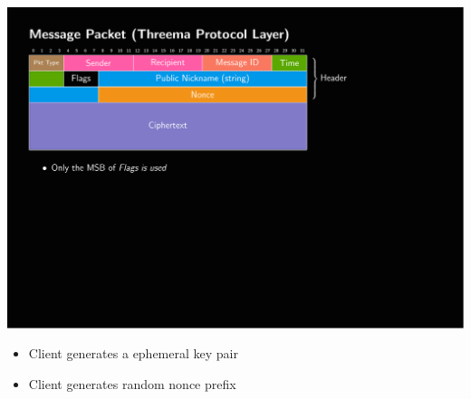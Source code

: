 \documentclass[
	aspectratio=169,
	xetex,
]{beamer}
\begin{document}
\begin{frame}[t]
\begin{overlayarea}{\textwidth}{\textheight}
\begin{columns}
\begin{column}[t]{.69\textwidth}
\begin{overlayarea}{\textwidth}{\textheight}
{						\includegraphics[page=11,clip,trim={.99cm 9cm 3.2cm 2.55cm},width=\textwidth]{out/messages.pdf}
						\begin{itemize}
							\item Client generates a \alert{ephemeral key} pair
							\item Client generates random nonce prefix
						\end{itemize}
					}	
\end{overlayarea}
\end{column}
\end{columns}
\end{overlayarea}
\end{frame}
\end{document}
